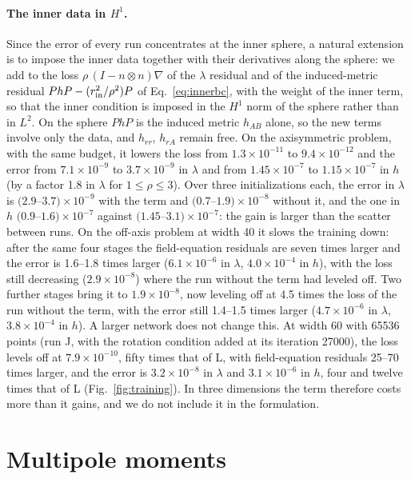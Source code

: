 \documentclass[aps,prd,twocolumn,superscriptaddress, nofootinbib,floatfix]{revtex4-2}
\begin{document}
\paragraph{The inner data in $H^1$.} Since the error of every run concentrates at the inner sphere, a natural extension is to impose the inner data together with their derivatives along the sphere: we add to the loss $\rho\,(I-n\otimes n)\nabla$ of the $\lambda$ residual and of the induced-metric residual $PhP-(r_{\rm in}^2/\rho^2)P$ of Eq.~\eqref{eq:innerbc}, with the weight of the inner term, so that the inner condition is imposed in the $H^1$ norm of the sphere rather than in $L^2$.
On the sphere $PhP$ is the induced metric $h_{AB}$ alone, so the new terms involve only the data, and $h_{rr}$, $h_{rA}$ remain free.
On the axisymmetric problem, with the same budget, it lowers the loss from $1.3\times10^{-11}$ to $9.4\times10^{-12}$ and the error from $7.1\times10^{-9}$ to $3.7\times10^{-9}$ in $\lambda$ and from $1.45\times10^{-7}$ to $1.15\times10^{-7}$ in $h$ (by a factor 1.8 in $\lambda$ for $1\le\rho\le3$).
Over three initializations each, the error in $\lambda$ is $(2.9$--$3.7)\times10^{-9}$ with the term and $(0.7$--$1.9)\times10^{-8}$ without it, and the one in $h$ $(0.9$--$1.6)\times10^{-7}$ against $(1.45$--$3.1)\times10^{-7}$: the gain is larger than the scatter between runs.
On the off-axis problem at width 40 it slows the training down: after the same four stages the field-equation residuals are seven times larger and the error is 1.6--1.8 times larger ($6.1\times10^{-6}$ in $\lambda$, $4.0\times10^{-4}$ in $h$), with the loss still decreasing ($2.9\times10^{-8}$) where the run without the term had leveled off.
Two further stages bring it to $1.9\times10^{-8}$, now leveling off at 4.5 times the loss of the run without the term, with the error still 1.4--1.5 times larger ($4.7\times10^{-6}$ in $\lambda$, $3.8\times10^{-4}$ in $h$).
A larger network does not change this.
At width 60 with 65536 points (run J, with the rotation condition added at its iteration 27000), the loss levels off at $7.9\times10^{-10}$, fifty times that of L, with field-equation residuals 25--70 times larger, and the error is $3.2\times10^{-8}$ in $\lambda$ and $3.1\times10^{-6}$ in $h$, four and twelve times that of L (Fig.~\ref{fig:training}).
In three dimensions the term therefore costs more than it gains, and we do not include it in the formulation.

\section{Multipole moments}\label{sec:moments}
\end{document}
